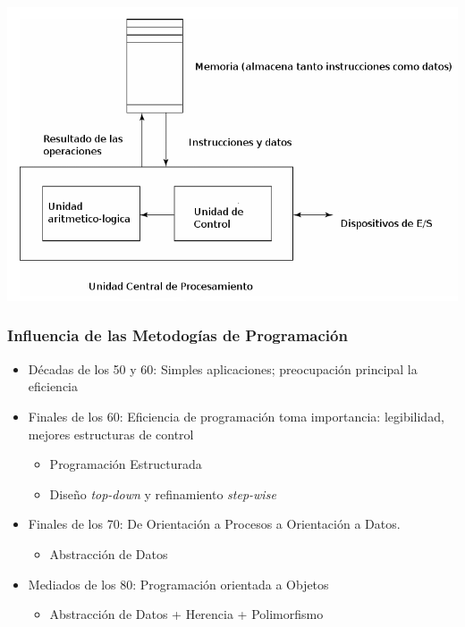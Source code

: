 \documentclass[11pt]{article}
\begin{document}
\includegraphics[width=.9\linewidth]{vonneumann.png} 

\subsubsection*{Influencia de las Metodogías de Programación}
\label{sec:orgheadline11}
\begin{itemize}
\item Décadas de los 50 y 60: Simples aplicaciones; preocupación principal
la eficiencia
\item Finales de los 60: Eficiencia de programación toma importancia:
legibilidad, mejores estructuras de control
\begin{itemize}
\item Programación Estructurada
\item Diseño \emph{top-down} y refinamiento \emph{step-wise}
\end{itemize}
\item Finales de los 70: De Orientación a Procesos a Orientación a Datos.
\begin{itemize}
\item Abstracción de Datos
\end{itemize}
\item Mediados de los 80: Programación orientada a Objetos
\begin{itemize}
\item Abstracción de Datos + Herencia + Polimorfismo
\end{itemize}
\end{itemize}
\end{document}
